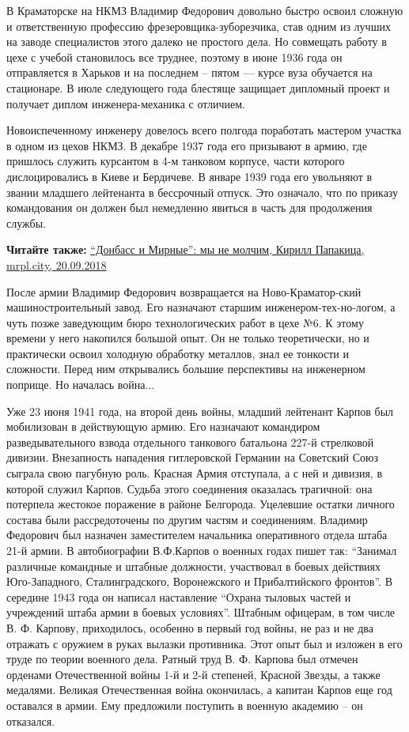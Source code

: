 В Краматорске на НКМЗ Владимир Федорович довольно быстро освоил сложную и
ответственную профессию фрезеровщика-зуборезчика, став одним из лучших на
заводе специалистов этого далеко не простого дела. Но совмещать работу в цехе с
учебой становилось все труднее, поэтому в июне 1936 года он отправляется в
Харьков и на последнем – пятом —  курсе вуза обучается на стационаре. В июле
следующего года блестяще защищает дипломный проект и получает диплом
инженера-механика с отличием.

Новоиспеченному инженеру довелось всего полгода поработать мастером участка в
одном из цехов НКМЗ. В декабре 1937 года его призывают в армию, где пришлось
служить курсантом в 4-м танковом корпусе, части которого дислоцировались в
Киеве и Бердичеве. В январе 1939 года его увольняют в звании младшего
лейтенанта в бессрочный отпуск. Это означало, что по приказу командования он
должен был немедленно явиться в часть для продолжения службы.

\textbf{Читайте также:} \href{https://mrpl.city/blogs/view/donbass-i-mirnye-my-ne-molchim}{%
\enquote{Донбасс и Мирные}: мы не молчим, Кирилл Папакица, mrpl.city, 20.09.2018}

После армии Владимир Федорович возвращается на Ново-Краматор\hyp{}ский
машиностроительный завод. Его назначают старшим инженером-тех\hyp{}но\hyp{}логом, а чуть
позже заведующим бюро технологических работ в цехе №6. К этому времени у него
накопился большой опыт. Он не только теоретически, но и практически освоил
холодную обработку металлов, знал ее тонкости и сложности. Перед ним
открывались большие перспективы на инженерном поприще. Но началась война...

Уже 23 июня 1941 года, на второй день войны, младший лейтенант Карпов был
мобилизован в действующую армию. Его назначают командиром разведывательного
взвода отдельного танкового батальона 227-й стрелковой дивизии. Внезапность
нападения гитлеровской Германии на Советский Союз сыграла свою пагубную роль.
Красная Армия отступала, а с ней и дивизия, в которой служил Карпов. Судьба
этого соединения оказалась трагичной: она потерпела жестокое поражение в районе
Белгорода. Уцелевшие остатки личного состава были рассредоточены по другим
частям и соединениям. Владимир Федорович был назначен заместителем начальника
оперативного отдела штаба 21-й армии. В автобиографии В.Ф.Карпов о военных
годах пишет так: \enquote{Занимал различные командные и штабные должности, участвовал в
боевых действиях Юго-Западного, Сталинградского, Воронежского и Прибалтийского
фронтов}. В середине 1943 года  он написал наставление \enquote{Охрана тыловых частей и
учреждений штаба армии в боевых условиях}. Штабным офицерам, в том числе
В. Ф. Карпову, приходилось, особенно в первый год войны, не раз и не два отражать
с оружием в руках вылазки противника. Этот опыт был и изложен в его труде по
теории военного дела. Ратный труд В. Ф. Карпова был отмечен орденами
Отечественной войны 1-й и 2-й степеней, Красной Звезды, а также медалями.
Великая Отечественная война окончилась, а капитан Карпов еще год оставался в
армии. Ему предложили поступить в военную академию – он отказался.

